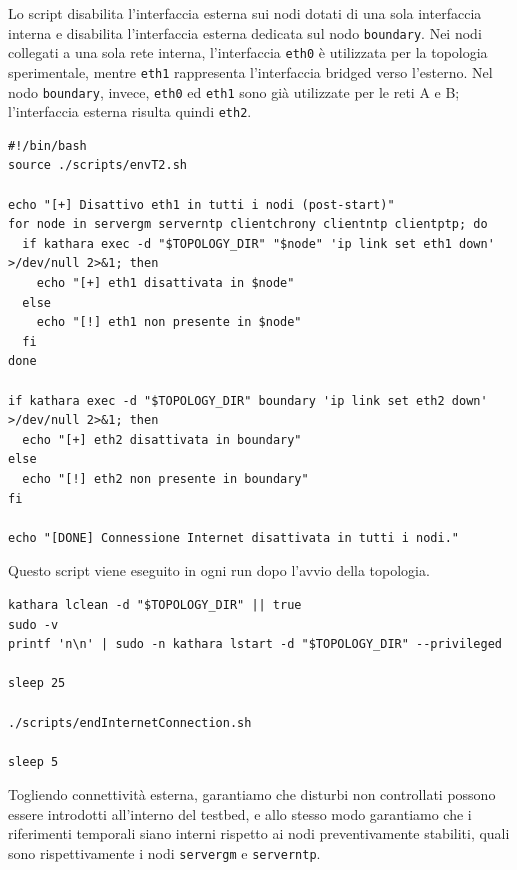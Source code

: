 Lo script disabilita l'interfaccia esterna sui nodi dotati di una sola
interfaccia interna e disabilita l'interfaccia esterna dedicata sul nodo \texttt{boundary}.
Nei nodi collegati a una sola rete interna, l'interfaccia \texttt{eth0} è
utilizzata per la topologia sperimentale, mentre \texttt{eth1} rappresenta l'interfaccia
bridged verso l'esterno. Nel nodo \texttt{boundary}, invece, \texttt{eth0} ed \texttt{eth1}
sono già utilizzate per le reti A e B; l'interfaccia esterna risulta quindi \texttt{eth2}.

\begin{listing}[H]
\begin{verbatim}
#!/bin/bash
source ./scripts/envT2.sh

echo "[+] Disattivo eth1 in tutti i nodi (post-start)"
for node in servergm serverntp clientchrony clientntp clientptp; do
  if kathara exec -d "$TOPOLOGY_DIR" "$node" 'ip link set eth1 down' >/dev/null 2>&1; then
    echo "[+] eth1 disattivata in $node"
  else
    echo "[!] eth1 non presente in $node"
  fi
done

if kathara exec -d "$TOPOLOGY_DIR" boundary 'ip link set eth2 down' >/dev/null 2>&1; then
  echo "[+] eth2 disattivata in boundary"
else
  echo "[!] eth2 non presente in boundary"
fi

echo "[DONE] Connessione Internet disattivata in tutti i nodi."
\end{verbatim}
\caption{Script \texttt{endInternetConnection.sh}: disabilitazione della connettività esterna.}
\label{lst:end_internet}
\end{listing}
Questo script viene eseguito in ogni run dopo l'avvio della topologia.

\begin{listing}[H]
\begin{verbatim}
kathara lclean -d "$TOPOLOGY_DIR" || true
sudo -v
printf 'n\n' | sudo -n kathara lstart -d "$TOPOLOGY_DIR" --privileged

sleep 25

./scripts/endInternetConnection.sh

sleep 5
\end{verbatim}
\caption{Punto del workflow in cui viene disabilitata la rete esterna.}
\label{lst:end_internet_workflow}
\end{listing}

Togliendo connettività esterna, garantiamo che disturbi non controllati possono essere
introdotti all'interno del testbed, e allo stesso modo garantiamo che i
riferimenti temporali siano interni rispetto ai nodi preventivamente stabiliti, quali
sono rispettivamente i nodi \texttt{servergm} e \texttt{serverntp}.

